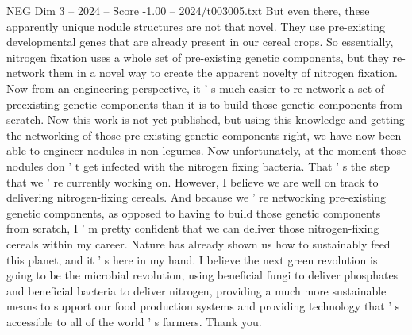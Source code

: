 \begin{textsample}{NEG Dim 3 – 2024 – Score -1.00 – 2024/t003005.txt}
But even there, these apparently unique nodule structures are not that novel.
They use pre-existing developmental genes that are already present in our cereal crops.
So essentially, nitrogen fixation uses a whole set of pre-existing genetic components, but they re-network them in a novel way to create the apparent novelty of nitrogen fixation.
Now from an engineering perspective, it ' s much easier to re-network a set of preexisting genetic components than it is to build those genetic components from scratch.
Now this work is not yet published, but using this knowledge and getting the networking of those pre-existing genetic components right, we have now been able to engineer nodules in non-legumes.
Now unfortunately, at the moment those nodules don ' t get infected with the nitrogen fixing bacteria.
That ' s the step that we ' re currently working on.
However, I believe we are well on track to delivering nitrogen-fixing cereals.
And because we ' re networking pre-existing genetic components, as opposed to having to build those genetic components from scratch, I ' m pretty confident that we can deliver those nitrogen-fixing cereals within my career.
Nature has already shown us how to sustainably feed this planet, and it ' s here in my hand.
I believe the next green revolution is going to be the microbial revolution, using beneficial fungi to deliver phosphates and beneficial bacteria to deliver nitrogen, providing a much more sustainable means to support our food production systems and providing technology that ' s accessible to all of the world ' s farmers.
Thank you.

\end{textsample}
